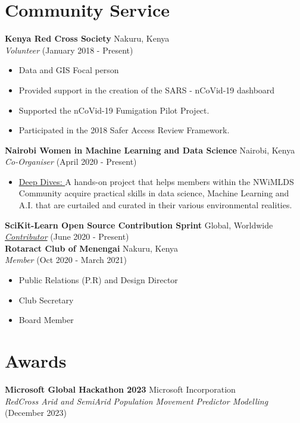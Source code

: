 \documentclass[line,margin,10pt]{res}
\begin{document}
\begin{resume}
\section{Community Service}
\textbf{Kenya Red Cross Society} \hfill Nakuru, Kenya\\
{\sl Volunteer} \hfill (January 2018 - Present)
\begin{itemize} \itemsep -2pt
    \item Data and GIS Focal person
    \item Provided support in the creation of the SARS - nCoVid-19 dashboard
    \item Supported the nCoVid-19 Fumigation Pilot Project.
    \item Participated in the 2018 Safer Access Review Framework.
\end{itemize}
\textbf{Nairobi Women in Machine Learning and Data Science} \hfill Nairobi, Kenya\\
{\sl Co-Organiser} \hfill (April 2020 - Present)
\begin{itemize} \itemsep -2pt
    \item \underline{Deep Dives: }
    A hands-on project that helps members within the NWiMLDS Community acquire practical skills in data science, Machine Learning and A.I. that are curtailed and curated in their various environmental realities.
\end{itemize}
\textbf{SciKit-Learn Open Source Contribution Sprint} \hfill Global, Worldwide\\
{\sl \href{https://sites.google.com/view/nyc-2020-scikit-sprint/contributors}{Contributor}} \hfill (June 2020 - Present) \\
\textbf{Rotaract Club of Menengai} \hfill Nakuru, Kenya\\
{\sl Member} \hfill (Oct 2020 - March 2021)
\begin{itemize} \itemsep -2pt
    \item Public Relations (P.R) and Design Director
    \item Club Secretary
    \item Board Member
\end{itemize}
{\vspace{-0,25cm}}

\section{Awards}
\textbf{Microsoft Global Hackathon 2023} \hfill Microsoft Incorporation\\
{\sl RedCross Arid and SemiArid Population Movement Predictor Modelling} \hfill (December 2023)


\end{resume}
\end{document}

